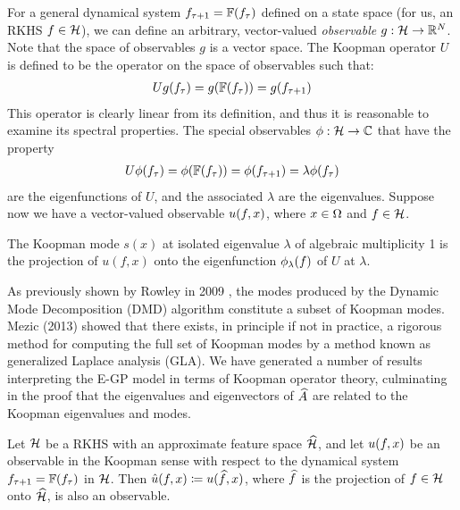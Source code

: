 For a general dynamical system $f_{\tau+1} = \mathbb{F}(f_{\tau})$ defined on a state space (for us, an RKHS $f\in\mathcal{H}$), we can define an arbitrary, vector-valued \emph{observable} $g : \mathcal{H} \to \mathbb{R}^{N}$. Note that the space of observables $g$ is a vector space. The Koopman operator $U$ is defined to be the operator on the space of observables such that:
\begin{align} \eqlabel{koopman_operator}
U g(f_{\tindex}) = g(\mathbb{F}(f_{\tindex})) = g(f_{\tindex+1})
\end{align}
This operator is clearly linear from its definition, and thus it is reasonable to examine its spectral properties. The special observables $\phi : \mathcal{H} \to \mathbb{C}$ that have the property
\begin{align} \eqlabel{koopman_eigenfunctions}
U \phi(f_{\tindex}) = \phi(\mathbb{F}(f_{\tindex})) = \phi(f_{\tindex+1}) = \lambda \phi(f_{\tindex})
\end{align}
are the eigenfunctions of $U$, and the associated $\lambda$ are the eigenvalues. Suppose now we have a vector-valued observable $u(f,x)$, where $x\in\Omega$ and $f\in\mathcal{H}$.

\begin{definition}
	The Koopman mode $s(x)$ at isolated eigenvalue $\lambda$ of algebraic multiplicity 1 is the projection of $u(f,x)$ onto the eigenfunction $\phi_{\lambda}(f)$ of $U$ at $\lambda$. \cite{mezic2013analysis}
\end{definition}

As previously shown by Rowley in 2009 \cite{rowley2009spectral}, the modes produced by the Dynamic Mode Decomposition (DMD) algorithm constitute a subset of Koopman modes. Mezic (2013) \cite{mezic2013analysis} showed that there exists, in principle if not in practice, a rigorous method for computing the full set of Koopman modes by a method known as generalized Laplace analysis (GLA). We have generated a number of results interpreting the E-GP model in terms of Koopman operator theory, culminating in the proof that the eigenvalues and eigenvectors of $\widehat{A}$ are related to the Koopman eigenvalues and modes.

\begin{proposition}\label{thm:ApproxObsv}
	Let $\mathcal{H}$ be a RKHS with  an approximate feature space $\widehat{\mathcal{H}}$, and let $u(f,x)$ be an observable in the Koopman sense with respect to the dynamical system $f_{\tau+1} = \mathbb{F}(f_{\tau})$ in $\mathcal{H}$. Then $\hat u(f,x) \coloneqq u(\widehat{f},x)$, where $\widehat{f}$ is the projection of $f\in\mathcal{H}$ onto $\widehat{\mathcal{H}}$, is also an observable.
\end{proposition}


